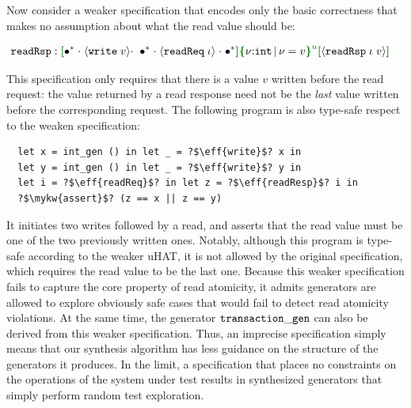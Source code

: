 %
Now consider a weaker specification that encodes only the basic correctness that makes no assumption about what the read value should be:
\vspace{-.4cm} \par\nobreak
{\small %
  \begin{align*}
    &\eff{readRsp}:
      \effLR{\allA\;\seqA\;\msgA{write}{v}\seqA\;\;\allA\;\seqA\;\msgA{readReq}{\iota}\;\seqA\;
      \allA}\urt{\Code{int}}{\vnu = v}\effLR{\msgA{readRsp}{\iota\;v}}
  \end{align*}}
\vspace{-.5cm} \par\nobreak\noindent
This specification only requires that there is a value $v$ written
  before the read request: the value returned by a read response need
  not be the \emph{last} value written before the corresponding request.
  The following program is also type-safe respect to the weaken specification:
  \begin{verbatim}
  let x = int_gen () in let _ = ?$\eff{write}$? x in
  let y = int_gen () in let _ = ?$\eff{write}$? y in
  let i = ?$\eff{readReq}$? in let z = ?$\eff{readResp}$? i in
  ?$\mykw{assert}$? (z == x || z == y)
  \end{verbatim}

  It initiates two writes followed by a read, and asserts that the read value must be one of the two previously written ones. Notably, although this program is type-safe according to the weaker uHAT, it is not allowed by the original specification, which requires the read value to be the last one. Because this weaker specification fails to capture the core property of read atomicity, it admits generators are allowed to explore obviously safe cases that would fail to detect read atomicity violations. At the same time, the generator ${\tt transaction\_gen}$ can also be derived from this weaker specification. Thus, an imprecise specification simply means that our synthesis algorithm has less guidance on the structure of the generators it produces. In the limit, a specification that places no constraints on the operations of the system under test results in synthesized generators that simply perform random test exploration.  

